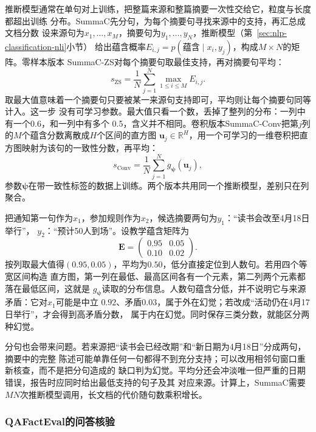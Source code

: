推断模型通常在单句对上训练，把整篇来源和整篇摘要一次性交给它，粒度与长度都超出训练
分布。SummaC先分句，为每个摘要句寻找来源中的支持，再汇总成文档分数
设来源句为$x_1,\ldots,x_M$，摘要句为$y_1,\ldots,y_N$，推断模型（第~\ref{sec:nlp-classification-nli}小节）
给出蕴含概率$E_{i,j}=p(\text{蕴含}\mid x_i,y_j)$，构成$M\times N$的矩阵。零样本版本
SummaC-ZS对每个摘要句取最佳支持，再对摘要句平均：
\begin{equation}
  s_{\mathrm{ZS}}=\frac{1}{N}\sum_{j=1}^{N}\max_{1\leq i\leq M}E_{i,j}.
  \label{eq:nlp-generation-summac}
\end{equation}
取最大值意味着一个摘要句只要被某一来源句支持即可，平均则让每个摘要句同等计入。这一步
没有可学习参数。最大值只看一个数，丢掉了整列的分布：一列中有一个0.6，和一列中有多个
0.5，含义并不相同。卷积版本SummaC-Conv把第$j$列的$M$个蕴含分数离散成$H$个区间的直方图
$\bm u_j\in\mathbb R^H$，用一个可学习的一维卷积把直方图映射为该句的一致性分数，再平均：
\begin{equation}
  s_{\mathrm{Conv}}=\frac{1}{N}\sum_{j=1}^{N}g_{\bm\psi}(\bm u_j),
  \label{eq:nlp-generation-summac-conv}
\end{equation}
参数$\bm\psi$在带一致性标签的数据上训练。两个版本共用同一个推断模型，差别只在列聚合。

把通知第一句作为$x_1$，参加规则作为$x_2$，候选摘要两句为$y_1$：“读书会改至4月18日举行”，
$y_2$：“预计50人到场”。设教学蕴含矩阵为
\[
  \bm E=\begin{pmatrix}0.95&0.05\\0.10&0.02\end{pmatrix}.
\]
按列取最大值得$(0.95,0.05)$，平均为$0.50$，低分直接定位到人数句。若用四个等宽区间构造
直方图，第一列在最低、最高区间各有一个元素，第二列两个元素都落在最低区间，这就是
$g_{\bm\psi}$读取的分布信息。人数句蕴含分低，并不说明它与来源矛盾：它对$x_1$可能是中立
$0.92$、矛盾$0.03$，属于外在幻觉；若改成“活动仍在4月17日举行”，才会得到高矛盾分数，
属于内在幻觉。同时保存三类分数，就能区分两种幻觉。

分句也会带来问题。若来源把“读书会已经改期”和“新日期为4月18日”分成两句，摘要中的完整
陈述可能单靠任何一句都得不到充分支持；可以改用相邻句窗口重新核查，而不是把分句造成的
缺口判为幻觉。平均分还会冲淡唯一但严重的日期错误，报告时应同时给出最低支持的句子及其
对应来源。计算上，SummaC需要$MN$次推断模型调用，长文档的代价随句数乘积增长。

\subsubsection{QAFactEval的问答核验}
\label{sec:nlp-generation-qafacteval}

